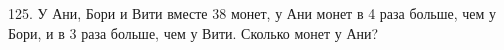 125. У Ани, Бори и Вити вместе 38 монет, у Ани монет в 4 раза больше, чем у Бори, и в 3 раза больше, чем у Вити. Сколько монет у Ани?\\
